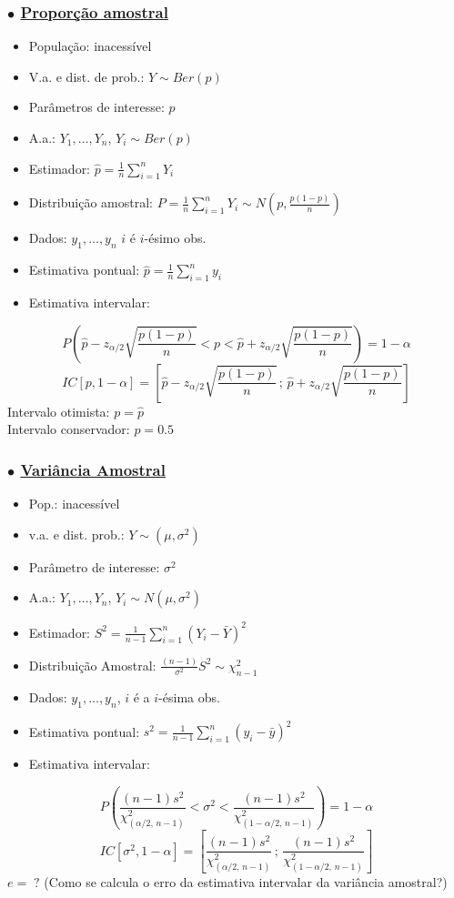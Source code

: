 \documentclass[11pt,a4paper]{article}
\begin{document}
\subsubsection*{$\bullet$ \underline{Proporção amostral}}
\begin{itemize}
  \item População: inacessível
  \item V.a. e dist. de prob.: $Y \sim Ber(p)$
  \item Parâmetros de interesse: $p$
  \item A.a.: $Y_1,\ldots,Y_n$, $Y_i \sim Ber(p)$
  \item Estimador: $\displaystyle \hat{p} = \frac{1}{n}\sum_{i=1}^{n} Y_i$
  \item Distribuição amostral: $\displaystyle P = \frac{1}{n}\sum_{i=1}^{n} Y_i \sim N\!\left(p,\frac{p(1-p)}{n}\right)$
  \item Dados: $y_1,\ldots,y_n$ $i$ é $i$-ésimo obs.
  \item Estimativa pontual: $\displaystyle \hat{p} = \frac{1}{n}\sum_{i=1}^{n} y_i$
  \item Estimativa intervalar:
\end{itemize}
\[ P\left(\hat{p} - z_{\alpha/2}\sqrt{\frac{p(1-p)}{n}} < p < \hat{p} + z_{\alpha/2}\sqrt{\frac{p(1-p)}{n}}\right) = 1-\alpha \]
\[ IC[p,1-\alpha] = \left[\hat{p} - z_{\alpha/2}\sqrt{\frac{p(1-p)}{n}}\,;\, \hat{p} + z_{\alpha/2}\sqrt{\frac{p(1-p)}{n}}\right] \]
Intervalo otimista: $p = \hat{p}$\\
Intervalo conservador: $p = 0.5$

\subsubsection*{$\bullet$ \underline{Variância Amostral}}
\begin{itemize}
  \item Pop.: inacessível
  \item v.a. e dist. prob.: $Y \sim (\mu,\sigma^2)$
  \item Parâmetro de interesse: $\sigma^2$
  \item A.a.: $Y_1,\ldots,Y_n$, $Y_i \sim N(\mu,\sigma^2)$
  \item Estimador: $\displaystyle S^2 = \frac{1}{n-1}\sum_{i=1}^{n}(Y_i-\bar{Y})^2$
  \item Distribuição Amostral: $\displaystyle \frac{(n-1)}{\sigma^2}S^2 \sim \chi^2_{n-1}$
  \item Dados: $y_1,\ldots,y_n$, $i$ é a $i$-ésima obs.
  \item Estimativa pontual: $\displaystyle s^2 = \frac{1}{n-1}\sum_{i=1}^{n}(y_i-\bar{y})^2$
  \item Estimativa intervalar:
\end{itemize}
\[ P\left(\frac{(n-1)s^2}{\chi^2_{(\alpha/2,\,n-1)}} < \sigma^2 < \frac{(n-1)s^2}{\chi^2_{(1-\alpha/2,\,n-1)}}\right) = 1-\alpha \]
\[ IC[\sigma^2,1-\alpha] = \left[\frac{(n-1)s^2}{\chi^2_{(\alpha/2,\,n-1)}}\,;\,\frac{(n-1)s^2}{\chi^2_{(1-\alpha/2,\,n-1)}}\right] \]
$e = \;?$ (Como se calcula o erro da estimativa intervalar da variância amostral?)
\end{document}
